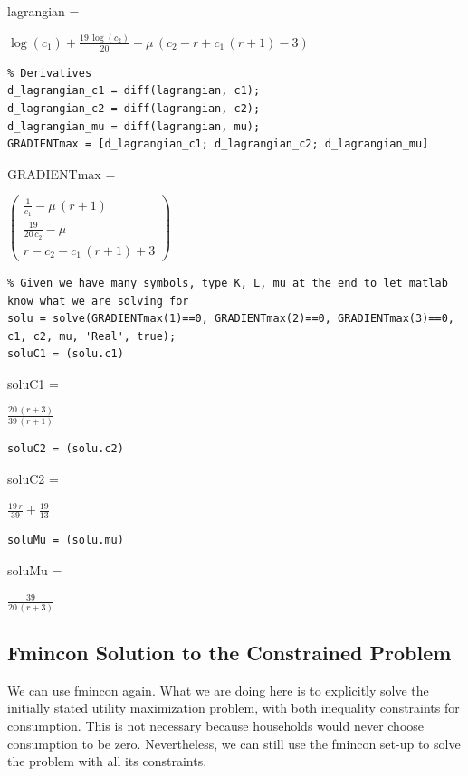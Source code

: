 \documentclass[
]{book}
\begin{document}
lagrangian =

\(\displaystyle \log \left(c_1 \right)+\frac{19\,\log \left(c_2 \right)}{20}-\mu \,{\left(c_2 -r+c_1 \,{\left(r+1\right)}-3\right)}\)

\begin{verbatim}
% Derivatives
d_lagrangian_c1 = diff(lagrangian, c1);
d_lagrangian_c2 = diff(lagrangian, c2);
d_lagrangian_mu = diff(lagrangian, mu);
GRADIENTmax = [d_lagrangian_c1; d_lagrangian_c2; d_lagrangian_mu]
\end{verbatim}

GRADIENTmax =

\(\displaystyle \left(\begin{array}{c} \frac{1}{c_1 }-\mu \,{\left(r+1\right)}\\ \frac{19}{20\,c_2 }-\mu \\ r-c_2 -c_1 \,{\left(r+1\right)}+3 \end{array}\right)\)

\begin{verbatim}
% Given we have many symbols, type K, L, mu at the end to let matlab know what we are solving for
solu = solve(GRADIENTmax(1)==0, GRADIENTmax(2)==0, GRADIENTmax(3)==0, c1, c2, mu, 'Real', true);
soluC1 = (solu.c1)
\end{verbatim}

soluC1 =

\(\displaystyle \frac{20\,{\left(r+3\right)}}{39\,{\left(r+1\right)}}\)

\begin{verbatim}
soluC2 = (solu.c2)
\end{verbatim}

soluC2 =

\(\displaystyle \frac{19\,r}{39}+\frac{19}{13}\)

\begin{verbatim}
soluMu = (solu.mu)
\end{verbatim}

soluMu =

\(\displaystyle \frac{39}{20\,{\left(r+3\right)}}\)

\hypertarget{fmincon-solution-to-the-constrained-problem}{%
\subsection{Fmincon Solution to the Constrained Problem}\label{fmincon-solution-to-the-constrained-problem}}

We can use fmincon again. What we are doing here is to explicitly solve
the initially stated utility maximization problem, with both inequality
constraints for consumption. This is not necessary because households
would never choose consumption to be zero. Nevertheless, we can still
use the fmincon set-up to solve the problem with all its constraints.
\end{document}
